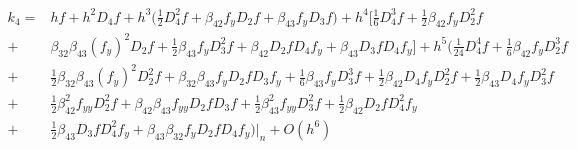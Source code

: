 \documentclass[12 pt]{article}
\begin{document}
\Large
\begin{align*}
k_{4} =& hf + h^{2}D_{4}f + h^{3}\bigg(\frac{1}{2}D_{4}^{2}f + \beta_{42}f_{y}D_{2}f + \beta_{43}f_{y}D_{3}f\bigg) + h^{4}\bigg[\frac{1}{6}D^{3}_{4}f + \frac{1}{2}\beta_{42}f_{y}D_{2}^{2}f\\
 	  +& \beta_{32}\beta_{43}(f_{y})^{2}D_{2}f + \frac{1}{2}\beta_{43}f_{y}D_{3}^{2}f + \beta_{42}D_{2}fD_{4}f_{y}	+ \beta_{43}D_{3}fD_{4}f_{y}\bigg] +  h^{5}\bigg(\frac{1}{24}D_{4}^{4}f + \frac{1}{6}\beta_{42}f_{y}D_{2}^{3}f\\
 	  +&\frac{1}{2}\beta_{32}\beta_{43}(f_{y})^{2}D_{2}^{2}f + \beta_{32}\beta_{43}f_{y}D_{2}fD_{3}f_{y} + \frac{1}{6}\beta_{43}f_{y}D_{3}^{3}f + \frac{1}{2}\beta_{42}D_{4}f_{y}D_{2}^{2}f + \frac{1}{2}\beta_{43}D_{4}f_{y}D_{3}^{2}f\\
 	  +&\frac{1}{2}\beta_{42}^{2}f_{yy}D_{2}^{2}f + \beta_{42}\beta_{43}f_{yy}D_{2}fD_{3}f + \frac{1}{2}\beta_{43}^{2}f_{yy}D_{3}^{2}f + \frac{1}{2}\beta_{42}D_{2}fD_{4}^{2}f_{y}\\
 	  +& \frac{1}{2}\beta_{43}D_{3}fD_{4}^{2}f_{y} + \beta_{43}\beta_{32}f_{y}D_{2}fD_{4}f_{y}\bigg)\bigg\vert_{n} + O(h^{6})
\end{align*}
\end{document}
